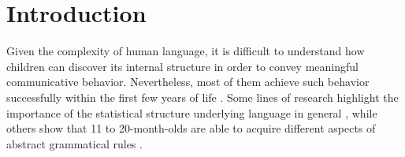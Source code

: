 {%

}{
\section{Introduction}

Given the complexity of human language, it is difficult to understand how children can discover its internal structure in order to convey meaningful communicative behavior. Nevertheless, most of them achieve such behavior successfully within the first few years of life \cite{Saffran12874}. Some lines of research highlight the importance of the statistical structure underlying language in general \cite{Romberg2010StatisticalLA, 10.1371/journal.pone.0177794}, while others show that 11 to 20-month-olds are able to acquire different aspects of abstract grammatical rules \cite{doi:10.1111/infa.12094, doi:10.1111/j.1467-8624.2012.01869.x}. 

}

